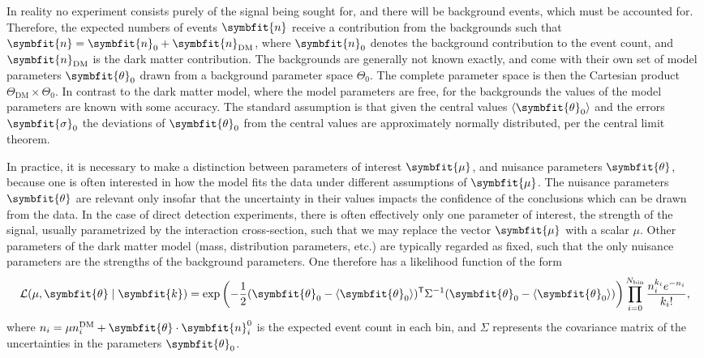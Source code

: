 \documentclass[b5paper, 10pt, twoside]{book}
\renewcommand{\vec}[1]{\symbfit{#1}}
\newcommand{\tmean}[1]{\langle#1\rangle}
\newcommand{\transp}{\mathsf{T}}
\begin{document}
In reality no experiment consists purely of the signal being sought for, and there will be background events, which must be accounted for. Therefore, the expected numbers of events $\vec{n}$ receive a contribution from the backgrounds such that $\vec{n}=\vec{n}_\text{0}+\vec{n}_\text{DM}$, where $\vec{n}_\text{0}$ denotes the background contribution to the event count, and $\vec{n}_\text{DM}$ is the dark matter contribution. The backgrounds are generally not known exactly, and come with their own set of model parameters $\vec{\theta}_0$ drawn from a background parameter space $\Theta_0$. The complete parameter space is then the Cartesian product $\Theta_\text{DM}\times\Theta_0$. In contrast to the dark matter model, where the model parameters are free, for the backgrounds the values of the model parameters are known with some accuracy. The standard assumption is that given the central values $\tmean{\vec{\theta}_0}$ and the errors $\vec{\sigma}_0$ the deviations of $\vec{\theta}_0$ from the central values are approximately normally distributed, per the central limit theorem.

In practice, it is necessary to make a distinction between parameters of interest $\vec{\mu}$, and nuisance parameters $\vec{\theta}$, because one is often interested in how the model fits the data under different assumptions of $\vec{\mu}$. The nuisance parameters $\vec{\theta}$ are relevant only insofar that the uncertainty in their values impacts the confidence of the conclusions which can be drawn from the data. In the case of direct detection experiments, there is often effectively only one parameter of interest, the strength of the signal, usually parametrized by the interaction cross-section, such that we may replace the vector $\vec{\mu}$ with a scalar $\mu$. Other parameters of the dark matter model (mass, distribution parameters, etc.) are typically regarded as fixed, such that the only nuisance parameters are the strengths of the background parameters. One therefore has a likelihood function of the form
\begin{equation}
    \mathcal{L}(\mu,\vec{\theta}\mid\vec{k})=\exp\left(-\frac{1}{2}(\vec{\theta}_0-\tmean{\vec{\theta}_0})^\transp\Sigma^{-1}(\vec{\theta}_0-\tmean{\vec{\theta}_0})\right)\prod_{i=0}^{N_\text{bin}}\frac{n_i^{k_i}e^{-n_i}}{{k_i}!},
    \label{eq:likelihood}
\end{equation}
where $n_i=\mu n_i^\text{DM}+\vec{\theta}\cdot\vec{n}_i^0$ is the expected event count in each bin, and $\Sigma$ represents the covariance matrix of the uncertainties in the parameters $\vec{\theta}_0$.
\end{document}
